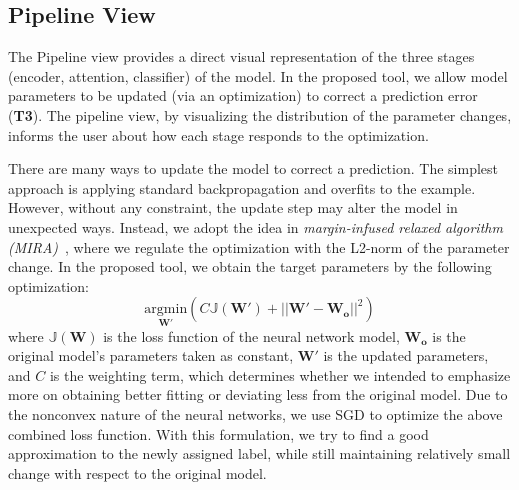 \subsection{Pipeline View}
\label{sec:pipeline}
The Pipeline view provides a direct visual representation of the three stages (encoder, attention, classifier) of the model. In the proposed tool, we allow model parameters to be updated (via an optimization) to correct a prediction error (\textbf{T3}). The pipeline view, by visualizing the distribution of the parameter changes, informs the user about how each stage responds to the optimization.

There are many ways to update the model to correct a prediction. The simplest approach is applying standard backpropagation and overfits to the example. However, without any constraint, the update step may alter the model in unexpected ways.
Instead, we adopt the idea in \emph{margin-infused relaxed algorithm (MIRA)}~\cite{CrammerSinger2003}, where we regulate the optimization with the L2-norm of the parameter change. In the proposed tool, we obtain the target parameters by the following optimization:
\begin{equation}
\underset{\mathbf{W}'}{\mathrm{argmin}}( C \mathbb{J}(\mathbf{W}') + ||\mathbf{W}' - \mathbf{W_o}||^2)
\end{equation}
where $\mathbb{J}(\mathbf{W})$ is the loss function of the neural network model, $\mathbf{W_o}$ is the original model's parameters taken as constant, $\mathbf{W}'$ is the updated parameters, and $C$ is the weighting term, which determines whether we intended to emphasize more on obtaining better fitting or deviating less from the original model. Due to the nonconvex nature of the neural networks, we use SGD to optimize the above combined loss function.
%
With this formulation, we try to find a good approximation to the newly assigned label, while still maintaining relatively small change with respect to the original model.

